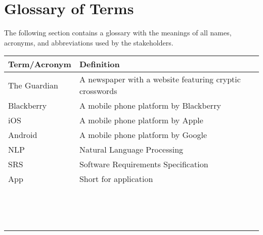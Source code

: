 \chapter*{Glossary of Terms}

The following section contains a glossary with the meanings of all names, 
acronyms, and abbreviations used by the stakeholders.

\begin{table}[H]
  \centering
  \small
  \begin{tabular}{|l|l|}
    \hline
    \textbf{Term/Acronym}  & \textbf{Definition}                            \\ 
    \hline
    The Guardian  & A newspaper with a website featuring cryptic crosswords \\ 
    \hline
    Blackberry    & A mobile phone platform by Blackberry                   \\ 
    \hline
    iOS           & A mobile phone platform by Apple                        \\ 
    \hline
    Android       & A mobile phone platform by  Google                      \\ 
    \hline
    NLP           & Natural Language Processing                             \\ 
    \hline
    SRS           & Software Requirements Specification                     \\ 
    \hline
    App           & Short for application                                   \\ 
    \hline
    ~             & ~                                                       \\ 
    \hline
    ~             & ~                                                       \\ 
    \hline
    ~             & ~                                                       \\ 
    \hline
  \end{tabular}
\end{table}